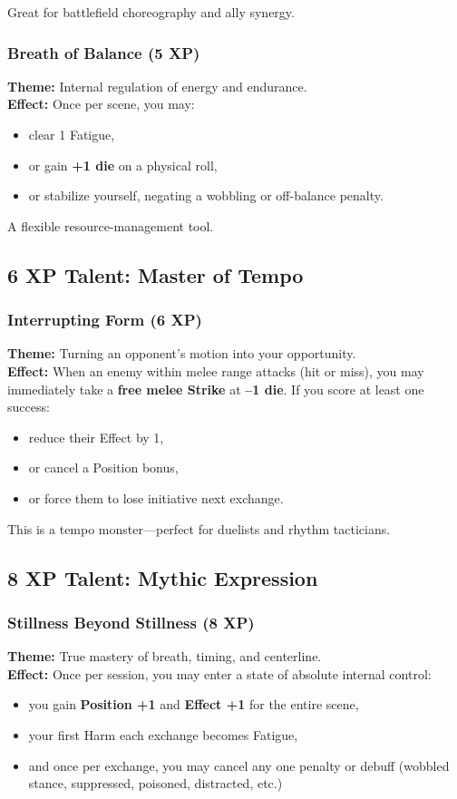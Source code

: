 \documentclass[11pt]{book}
\begin{document}
Great for battlefield choreography and ally synergy.

\subsubsection{Breath of Balance (5 XP)}
\textbf{Theme:} Internal regulation of energy and endurance.\\
\textbf{Effect:} Once per scene, you may:
\begin{itemize}
  \item clear 1 Fatigue,
  \item or gain \textbf{+1 die} on a physical roll,
  \item or stabilize yourself, negating a wobbling or off-balance penalty.
\end{itemize}

A flexible resource-management tool.

\subsection{6 XP Talent: Master of Tempo}

\subsubsection{Interrupting Form (6 XP)}
\textbf{Theme:} Turning an opponent's motion into your opportunity.\\
\textbf{Effect:} When an enemy within melee range attacks (hit or miss),
you may immediately take a \textbf{free melee Strike} at \textbf{--1 die}.
If you score at least one success:
\begin{itemize}
  \item reduce their Effect by 1,
  \item or cancel a Position bonus,
  \item or force them to lose initiative next exchange.
\end{itemize}

This is a tempo monster---perfect for duelists and rhythm tacticians.

\subsection{8 XP Talent: Mythic Expression}

\subsubsection{Stillness Beyond Stillness (8 XP)}
\textbf{Theme:} True mastery of breath, timing, and centerline.\\
\textbf{Effect:} Once per session, you may enter a state of absolute internal control:
\begin{itemize}
  \item you gain \textbf{Position +1} and \textbf{Effect +1} for the entire scene,
  \item your first Harm each exchange becomes Fatigue,
  \item and once per exchange, you may cancel any one penalty or debuff
        (wobbled stance, suppressed, poisoned, distracted, etc.)
\end{itemize}
\end{document}
